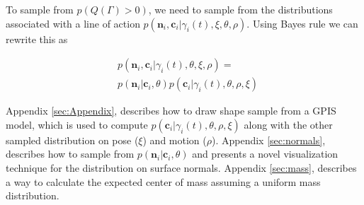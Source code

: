 \documentclass[journal,transmag]{IEEEtran}%
\begin{document}
To sample from $p(Q(\Gamma)>0)$, we need to sample from the distributions associated with a line of action $p(\textbf{n}_i,\textbf{c}_i|\gamma_i(t),\xi,\theta, \rho)$. Using Bayes rule  we can rewrite this as 
 
 \vspace{-2ex}
 \begin{align*}
 &p(\textbf{n}_i,\textbf{c}_i |\gamma_i(t),\theta,\xi,\rho)=\\
 &p(\textbf{n}_i|\textbf{c}_i,\theta)p(\textbf{c}_i|\gamma_i(t),\theta,\rho,\xi)
 \end{align*}

 
Appendix \ref{sec:Appendix}, describes how to draw shape sample from a GPIS model, which is used to compute $p(\textbf{c}_i|\gamma_i(t),\theta,\rho,\xi)$ along with the other sampled distribution on pose ($\xi$) and motion ($\rho$). Appendix \ref{sec:normals}, describes how to sample from $p(\textbf{n}_i|\textbf{c}_i,\theta)$ and presents a novel visualization technique for the distribution on surface normals.  Appendix \ref{sec:mass}, describes a way to calculate the expected center of mass assuming a uniform mass distribution. 

%
\end{document}
